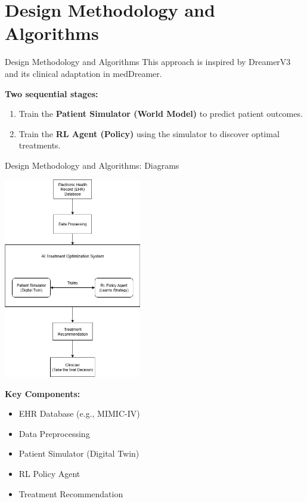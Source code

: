\documentclass[11pt]{beamer}
\begin{document}
\section{Design Methodology and Algorithms}
\begin{frame}{Design Methodology and Algorithms}
This approach is inspired by DreamerV3 and its clinical adaptation in medDreamer.  

\textbf{Two sequential stages:}
\begin{enumerate}
    \item Train the \textbf{Patient Simulator (World Model)} to predict patient outcomes.  
    \item Train the \textbf{RL Agent (Policy)} using the simulator to discover optimal treatments.
\end{enumerate}
\end{frame}

\begin{frame}{Design Methodology and Algorithms: Diagrams}
    \begin{center}
        \includegraphics[width=0.45\textwidth]{design_flow.jpg} %
    \end{center}
    \textbf{Key Components:}
    \begin{itemize}
        \item EHR Database (e.g., MIMIC-IV)
        \item Data Preprocessing
        \item Patient Simulator (Digital Twin)
        \item RL Policy Agent
        \item Treatment Recommendation
    \end{itemize}
\end{frame}
\end{document}
